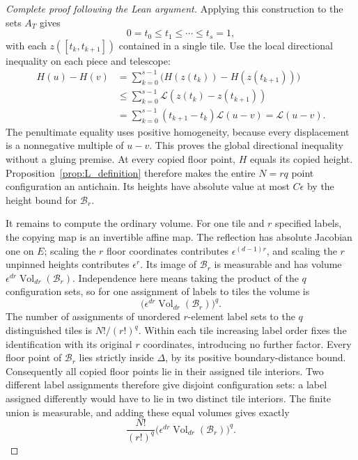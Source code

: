 \begin{proof}[Complete proof following the Lean argument]
Applying this construction to the sets \(A_T\) gives
\[
       0=t_0\le t_1\le\cdots\le t_s=1,
\]
with each \(z([t_k,t_{k+1}])\) contained in a single tile.
Use the local directional inequality on each piece and telescope:
\[
\begin{aligned}
 H(u)-H(v)
 &=\sum_{k=0}^{s-1}\bigl(H(z(t_k))-H(z(t_{k+1}))\bigr)\\
 &\le\sum_{k=0}^{s-1}\mathcal L(z(t_k)-z(t_{k+1}))\\
 &=\sum_{k=0}^{s-1}(t_{k+1}-t_k)\mathcal L(u-v)
 =\mathcal L(u-v).
\end{aligned}
\]
The penultimate equality uses positive homogeneity, because every
displacement is a nonnegative multiple of \(u-v\).
This proves the global directional inequality without a gluing premise.
At every copied floor point, \(H\) equals its copied height.
Proposition~\ref{prop:L_definition} therefore makes the entire \(N=rq\)
point configuration an antichain. Its heights have absolute value at
most \(C\epsilon\) by the height bound for \(\mathcal B_r\).

It remains to compute the ordinary volume.
For one tile and \(r\) specified labels, the copying map is an invertible
affine map. The reflection has absolute Jacobian one on \(E\);
scaling the \(r\) floor coordinates contributes
\(\epsilon^{(d-1)r}\), and scaling the \(r\) unpinned heights contributes
\(\epsilon^r\).
Its image of \(\mathcal B_r\) is measurable and has volume
\(\epsilon^{dr}\operatorname{Vol}_{dr}(\mathcal B_r)\).
Independence here means taking the product of the \(q\) configuration
sets, so for one assignment of labels to tiles the volume is
\[
        \bigl(\epsilon^{dr}\operatorname{Vol}_{dr}(\mathcal B_r)\bigr)^q.
\]
The number of assignments of unordered \(r\)-element label sets to the
\(q\) distinguished tiles is \(N!/(r!)^q\).
Within each tile increasing label order fixes the identification with
its original \(r\) coordinates, introducing no further factor.
Every floor point of \(\mathcal B_r\) lies strictly inside \(\Delta\),
by its positive boundary-distance bound. Consequently all copied floor
points lie in their assigned tile interiors.
Two different label assignments therefore give disjoint configuration
sets: a label assigned differently would have to lie in two distinct
tile interiors. The finite union is measurable, and adding these equal
volumes gives exactly
\[
        \frac{N!}{(r!)^q}
        \bigl(\epsilon^{dr}\operatorname{Vol}_{dr}(\mathcal B_r)\bigr)^q.
\]
\end{proof}
